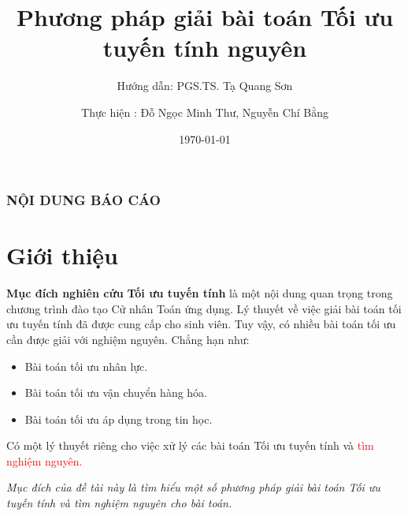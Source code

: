 \documentclass[10pt]{beamer}
\title{Phương pháp giải bài toán Tối ưu tuyến tính nguyên}
\date{\today}
\author{Thực hiện : Đỗ Ngọc Minh Thư, Nguyễn Chí Bằng}
\institute{Sinh viên lớp: DTU1221, Khóa: 22 @ Đại học Sài Gòn}
\subtitle{Hướng dẫn: PGS.TS. Tạ Quang Sơn}
\begin{document}
\maketitle
\begin{frame}
    \frametitle{NỘI DUNG BÁO CÁO}
    \tableofcontents
\end{frame}

\section{Giới thiệu}

\begin{frame}{\bf Mục đích nghiên cứu}
\textbf{Tối ưu tuyến tính} là một nội dung quan trọng trong chương trình đào tạo Cử nhân Toán ứng dụng. Lý thuyết về việc giải bài toán tối ưu tuyến tính đã được cung cấp cho sinh viên. Tuy vậy, có nhiều bài toán tối ưu cần được giải với nghiệm nguyên. Chẳng hạn như:
\begin{itemize}
\item Bài toán tối ưu nhân lực.
\item Bài toán tối ưu vận chuyển hàng hóa.
\item Bài toán tối ưu áp dụng trong tin học.
\end{itemize}

\bigskip
Có một lý thuyết riêng cho việc xử lý các bài toán Tối ưu tuyến tính và \textcolor{red}{tìm nghiệm nguyên.}
\bigskip

{\it Mục đích của đề tài này là tìm hiểu một số phương pháp giải bài toán Tối ưu tuyến tính và tìm nghiệm nguyên cho bài toán.}  
\end{frame}
\end{document}
